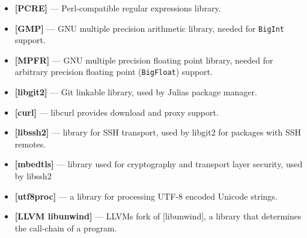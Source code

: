 \begin{itemize}
\item \textbf{[PCRE]}                 — Perl-compatible regular expressions library.


\item \textbf{[GMP]}                  — GNU multiple precision arithmetic library, needed for \texttt{BigInt} support.


\item \textbf{[MPFR]}                 — GNU multiple precision floating point library, needed for arbitrary precision floating point (\texttt{BigFloat}) support.


\item \textbf{[libgit2]}              — Git linkable library, used by Julia{\textquotesingle}s package manager.


\item \textbf{[curl]}                 — libcurl provides download and proxy support.


\item \textbf{[libssh2]}              — library for SSH transport, used by libgit2 for packages with SSH remotes.


\item \textbf{[mbedtls]}              — library used for cryptography and transport layer security, used by libssh2


\item \textbf{[utf8proc]}             — a library for processing UTF-8 encoded Unicode strings.


\item \textbf{[LLVM libunwind]}       — LLVM{\textquotesingle}s fork of [libunwind], a library that determines the call-chain of a program.

\end{itemize}


